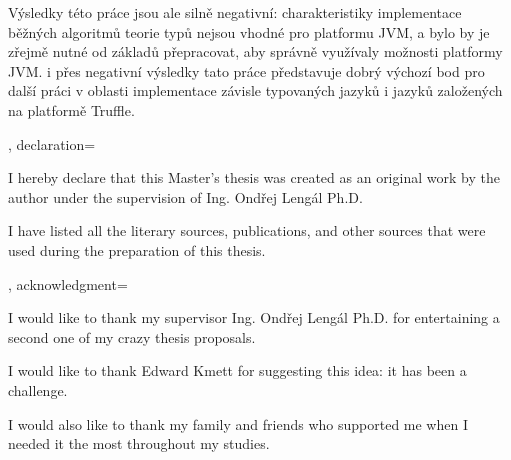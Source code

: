 {{  Výsledky této práce jsou ale silně negativní: charakteristiky implementace běžných algoritmů teorie typů nejsou vhodné pro platformu JVM, a bylo by je zřejmě nutné od základů přepracovat, aby správně využívaly možnosti platformy JVM.  i přes negativní výsledky tato práce představuje dobrý výchozí bod pro další práci v oblasti implementace závisle typovaných jazyků i jazyků založených na platformě Truffle.

},
  declaration={
    I hereby declare that this Master's thesis was created as an original work
    by the author under the supervision of Ing. Ondřej Lengál Ph.D.

    I have listed all the literary sources, publications, and other sources
    that were used during the preparation of this thesis.
  },
  acknowledgment={
    I would like to thank my supervisor Ing. Ondřej Lengál Ph.D. for entertaining a
    second one of my crazy thesis proposals.

    I would like to thank Edward Kmett for suggesting this idea: it has been a
    challenge.

    I would also like to thank my family and friends who supported me when I needed
    it the most throughout my studies.
  }
}
